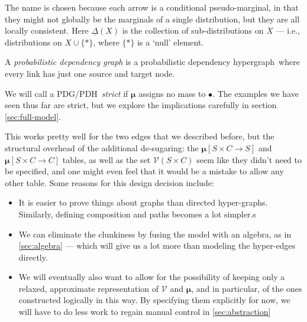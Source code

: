 \documentclass{article}
\newcommand\changed[1]{{\color{note-fg} #1}}
\newcommand\changeoff{\color{black} }
\newcommand\bmu{\boldsymbol{\mu}}
\newcommand{\modelname}{probabilistic dependency graph}
\newcommand{\modelnamehyper}{probabilistic dependency hypergraph}
\newcommand{\MN}{PDG}
\newcommand{\MNH}{PDH}
\begin{document}
	The name is chosen because each arrow is a conditional pseudo-marginal, in that they might not
	globally be the marginals of a single distribution, but they are all locally consistent. 
	Here $\underline\Delta(X)$ is the collection of sub-distributions on $X$ --- i.e., distributions on $X \cup \{*\}$, where $\{*\}$ is a `null' element. 

	\begin{defn}[\MN]\label{def:model}
		A \textit{\modelname} is a \modelnamehyper\ where every link has just one source and target node.
	\end{defn}

	We will call a \MN/\MNH\ \emph{strict} if $\bmu$ assigns no mass to $\bullet$. The examples we have seen thus far are strict, but we explore the implications carefully in section \ref{sec:full-model}.

	
	




	\changeoff



	

	\begin{vfull}
		This works pretty well for the two edges that we described before, but the structural overhead of the additional de-sugaring: the $\boldsymbol\mu[S\times C\to S]$ and $\boldsymbol\mu[S\times C\to C]$ tables, as well as the set $\mathcal V(S \times C)$ seem like they didn't need to be specified, and one might even feel that it would be a mistake to allow any other table. Some reasons for this design decision include:
		\begin{itemize}[nosep]
			\item It is easier to prove things about graphs than directed hyper-graphs. Similarly, defining composition and paths becomes a lot simpler.s
			\item We can eliminate the clunkiness by fusing the model with an algebra, as in \cref{sec:algebra} --- which will give us a lot more than modeling the hyper-edges directly.
			\item We will eventually also want to allow for the possibility of keeping only a relaxed, approximate representation of $\mathcal V$ and $\bmu$, and in particular, of the ones constructed logically in this way. By specifying them explicitly for now, we will have to do less work to regain manual control in \cref{sec:abstraction}
		\end{itemize}
	\end{vfull}
\end{document}
